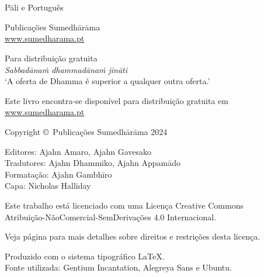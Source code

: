 
\thispagestyle{empty}

\enlargethispage{\baselineskip}

{\centering\small
\setlength{\parskip}{15pt}

{\normalsize
\thetitle\\
\thesubtitle\\
Pāli e Português}

Publicações Sumedhārāma\\
\href{http://sumedharama.pt}{www.sumedharama.pt}

Para distribuição gratuita\\
\textit{Sabbadānaṁ dhammadānaṁ jināti}\\
‘A oferta de Dhamma é superior a qualquer outra oferta.’

Este livro encontra-se disponível para distribuição gratuita em\\
\href{http://sumedharama.pt}{www.sumedharama.pt}


Copyright \copyright\ Publicações Sumedhārāma 2024

Editores: Ajahn Amaro, Ajahn Gavesako\\
Tradutores: Ajahn Dhammiko, Ajahn Appamādo\\
Formatação: Ajahn Gambhīro\\
Capa: Nicholas Halliday

\vfill

Este trabalho está licenciado com uma Licença Creative Commons\\
Atribuição-NãoComercial-SemDerivações 4.0 Internacional.

Veja página \pageref{copyright-details} para mais detalhes sobre direitos e restrições desta licença.

Produzido com o sistema tipográfico \LaTeX.\\
Fonte utilizada: Gentium Incantation, Alegreya Sans e Ubuntu.

\theEditionInfo

}
